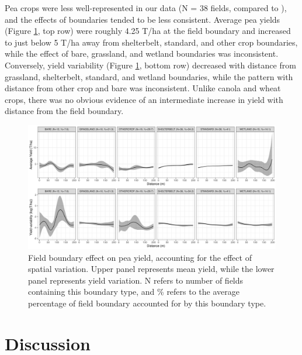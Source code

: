 \documentclass[]{elsarticle} %
\begin{document}
Pea crops were less well-represented in our data (N = 38 fields, compared to ), and the effects of boundaries tended to be less consistent.
Average pea yields (Figure \ref{fig:peaPlot}, top row) were roughly 4.25 T/ha at the field boundary and increased to just below 5 T/ha away from shelterbelt, standard, and other crop boundaries, while the effect of bare, grassland, and wetland boundaries was inconsistent.
Conversely, yield variability (Figure \ref{fig:peaPlot}, bottom row) decreased with distance from grassland, shelterbelt, standard, and wetland boundaries, while the pattern with distance from other crop and bare was inconsistent.
Unlike canola and wheat crops, there was no obvious evidence of an intermediate increase in yield with distance from the field boundary.

\begin{figure}
\includegraphics[width=1\linewidth]{../Figures/ModelSummary3a_peas} \caption{Field boundary effect on pea yield, accounting for the effect of spatial variation. Upper panel represents mean yield, while the lower panel represents yield variation. N refers to number of fields containing this boundary type, and \% refers to the average percentage of field boundary accounted for by this boundary type.}\label{fig:peaPlot}
\end{figure}

\hypertarget{discussion}{%
\section{Discussion}\label{discussion}}
\end{document}
